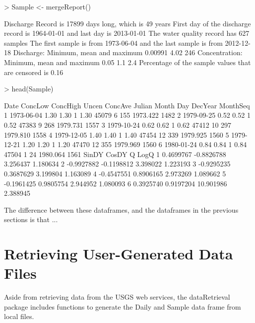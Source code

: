 \documentclass[a4paper,11pt]{article}
\begin{document}
\begin{Schunk}
\begin{Sinput}
> Sample <- mergeReport()
\end{Sinput}
\begin{Soutput}
 Discharge Record is 17899 days long, which is 49 years
 First day of the discharge record is 1964-01-01 and last day is 2013-01-01
 The water quality record has 627 samples
 The first sample is from 1973-06-04 and the last sample is from 2012-12-18
 Discharge: Minimum, mean and maximum 0.00991 4.02 246
 Concentration: Minimum, mean and maximum 0.05 1.1 2.4
 Percentage of the sample values that are censored is 0.16 %
\end{Soutput}
\begin{Sinput}
> head(Sample)
\end{Sinput}
\begin{Soutput}
        Date ConcLow ConcHigh Uncen ConcAve Julian Month Day  DecYear MonthSeq
1 1973-06-04    1.30     1.30     1    1.30  45079     6 155 1973.422     1482
2 1979-09-25    0.52     0.52     1    0.52  47383     9 268 1979.731     1557
3 1979-10-24    0.62     0.62     1    0.62  47412    10 297 1979.810     1558
4 1979-12-05    1.40     1.40     1    1.40  47454    12 339 1979.925     1560
5 1979-12-21    1.20     1.20     1    1.20  47470    12 355 1979.969     1560
6 1980-01-24    0.84     0.84     1    0.84  47504     1  24 1980.064     1561
       SinDY      CosDY         Q     LogQ
1  0.4699767 -0.8826788  3.256437 1.180634
2 -0.9927882 -0.1198812  3.398022 1.223193
3 -0.9295235  0.3687629  3.199804 1.163089
4 -0.4547551  0.8906165  2.973269 1.089662
5 -0.1961425  0.9805754  2.944952 1.080093
6  0.3925740  0.9197204 10.901986 2.388945
\end{Soutput}
\end{Schunk}

The difference between these dataframes, and the dataframes in the previous sections is that ...


\newpage
\section{Retrieving User-Generated Data Files}
Aside from retrieving data from the USGS web services, the dataRetrieval package includes functions to generate the Daily and Sample data frame from local files.

\end{document}
